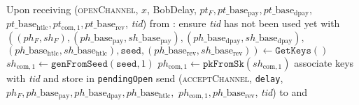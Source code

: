 \begin{algorithmic}[1]
    \State Upon receiving (\textsc{openChannel}, $x$, BobDelay, $pt_F,
    pt\_\mathrm{base}_{\mathrm{pay}}, pt\_\mathrm{base}_{\mathrm{dpay}},$
    $pt\_\mathrm{base}_{\mathrm{htlc}}, pt_{\mathrm{com}, 1},
    pt\_\mathrm{base}_{\mathrm{rev}}$, \textit{tid}) from \bob:
    \Indent
      \State ensure \textit{tid} has not been used yet with \bob
      \State $\left(\left(ph_F, sh_F\right),
      \left(ph\_\mathrm{base}_{\mathrm{pay}},
      sh\_\mathrm{base}_{\mathrm{pay}}\right),
      \left(ph\_\mathrm{base}_{\mathrm{dpay}},
      sh\_\mathrm{base}_{\mathrm{dpay}}\right),\right.$
      $\left.\left(ph\_\mathrm{base}_{\mathrm{htlc}},
      sh\_\mathrm{base}_{\mathrm{htlc}}\right), \mathtt{seed},
      \left(ph\_\mathrm{base}_{\mathrm{rev}},
      sh\_\mathrm{base}_{\mathrm{rev}}\right)\right) \gets
      \texttt{GetKeys}\left(\right)$
      \State $sh_{\mathrm{com}, 1} \gets
      \texttt{genFromSeed}\left(\mathtt{seed}, 1\right)$
      \State $ph_{\mathrm{com}, 1} \gets
      \mathtt{pkFromSk}\left(sh_{\mathrm{com}, 1}\right)$
      \State associate keys with \textit{tid} and store in \texttt{pendingOpen}
      \State send (\textsc{acceptChannel}, \texttt{delay}, $ph_F,
      ph\_\mathrm{base}_{\mathrm{pay}}, ph\_\mathrm{base}_{\mathrm{dpay}},
      ph\_\mathrm{base}_{\mathrm{htlc}},$ $ph_{\mathrm{com}, 1},
      ph\_\mathrm{base}_{\mathrm{rev}}$, \textit{tid}) to \bob{} and \adversary
    \EndIndent
    \State


\end{algorithmic}

